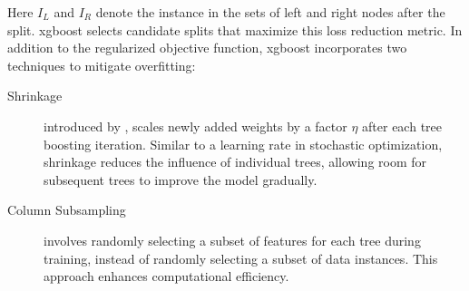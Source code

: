 \noindent
Here $I_L$ and $I_R$ denote the instance in the sets of left and right nodes after the split. \gls{xgboost} selects candidate splits that maximize this loss reduction metric.
\newline
\newline
In addition to the regularized objective function, \gls{xgboost} incorporates two techniques to mitigate overfitting:

\begin{description}
   \item[Shrinkage] introduced by \cite{friedman2002stochastic}, scales newly added weights by a factor $\eta$ after each tree boosting iteration. Similar to a learning rate in stochastic optimization, shrinkage reduces the influence of individual trees, allowing room for subsequent trees to improve the model gradually.
   \item[Column Subsampling] involves randomly selecting a subset of features for each tree during training, instead of randomly selecting a subset of data instances. This approach enhances computational efficiency.
\end{description} 